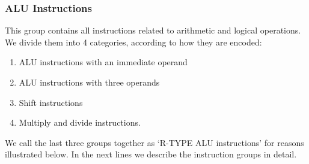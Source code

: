 \documentclass[]{scrartcl}
\begin{document}
\subsubsection{ALU Instructions}

This group contains all instructions related to arithmetic
and logical operations. We divide them into 4 categories,
according to how they are encoded:

\begin{enumerate}

\item ALU instructions with an immediate operand
\item ALU instructions with three operands
\item Shift instructions
\item Multiply and divide instructions.

\end{enumerate}

We call the last three groups together as `R-TYPE ALU instructions'
for reasons illustrated below. In the next lines we describe the
instruction groups in detail.
\end{document}
